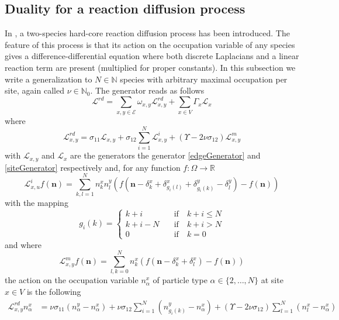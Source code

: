 \documentclass[11pt]{article}
\numberwithin{equation}{section}
\numberwithin{equation}{subsection}
\begin{document}
\subsection{Duality for a reaction diffusion process}
In \cite{casini2022uphill}, a two-species hard-core reaction diffusion process has been introduced. The feature of this process is that its action on the occupation variable of any species gives a difference-differential equation where both discrete Laplacians and a linear reaction term are present (multiplied for proper constants). In this subsection we write a generalization to $N\in \mathbb{N}$ species with arbitrary maximal occupation per site, again called $\nu\in\mathbb{N}_{0}$. The generator reads as follows
\begin{equation}\label{RDGenerator}
    \mathcal{L}^{rd}=\sum_{x,y\in\mathcal{E}}\omega_{x,y}\mathcal{L}_{x,y}^{rd}+\sum_{x\in V}\Gamma_{x}\mathcal{L}_{x}
\end{equation}
where
\begin{equation}
    \mathcal{L}_{x,y}^{rd}=\sigma_{11}\mathcal{L}_{x,y}+\sigma_{12}\sum_{i=1}^{N}\mathcal{L}_{x,y}^{i}+(\Upsilon-2\nu\sigma_{12})\mathcal{L}_{x,y}^{m}
\end{equation}
with $\mathcal{L}_{x,y}$ and $\mathcal{L}_{x}$ are the generators the generator \eqref{edgeGenerator} and \eqref{siteGenerator} respectively and, for any function $f:\Omega\to \mathbb{R}$
\begin{equation}
    \mathcal{L}_{x,u}^{i}f(\bm{n})=\sum_{k,l=1}^{N}n_{k}^{x}n_{l}^{y}\left(f(\bm{n}-\delta_{k}^{x}+\delta_{g_{i}(l)}^{x}+\delta_{g_{i}(k)}^{y}-\delta_{l}^{y})-f(\bm{n})\right)
\end{equation}
with the mapping 
\begin{equation}
    g_{i}(k)=\begin{cases}
    k+i \quad &\text{if}\quad k+i\leq N\\
    k+i-N\quad &\text{if}\quad k+i>N\\
    0\quad &\text{if}\quad k=0
\end{cases}
\end{equation}
and where
\begin{equation}
    \mathcal{L}_{x,y}^{m}f(\bm{n})=\sum_{l,k=0}^{N}n_{k}^{x}\left(f(\bm{n}-\delta_{k}^{x}+\delta_{l}^{x})-f(\bm{n})\right)
\end{equation}
the action on the occupation variable $n_{\alpha}^{x}$ of particle type $\alpha\in \{2,\ldots,N\}$ at site $x\in V $
is the following
\begin{equation}\label{actionGraphRD}
\begin{split}
    \mathcal{L}_{x,y}^{rd}n_{\alpha}^{x}&=\nu \sigma_{11}(n_{\alpha}^{y}-n_{\alpha}^{x})+\nu\sigma_{12}\sum_{i=1}^{N}(n_{g_{i}(k)}^{y}-n_{\alpha}^{x})+(\Upsilon-2\nu\sigma_{12})\sum_{l=1}^{N}(n_{l}^{x}-n_{\alpha}^{x})
\end{split}
\end{equation}
\end{document}
